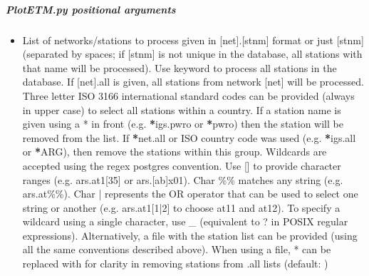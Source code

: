 \documentclass[letterpaper,10pt,english]{sphinxmanual}
\begin{document}
\subparagraph{PlotETM.py positional arguments}
\label{\detokenize{pgamit.com:PlotETM.py-positional-arguments}}\begin{itemize}
\item {} 
\sphinxAtStartPar
{\hyperref[\detokenize{pgamit.com:PlotETM.py-stnlist}]{}} \sphinxhyphen{} List of networks/stations to process given in {[}net{]}.{[}stnm{]} format or just {[}stnm{]} (separated by spaces; if {[}stnm{]} is not unique in the database, all stations with that name will be processed). Use keyword  to process all stations in the database. If {[}net{]}.all is given, all stations from network {[}net{]} will be processed. Three letter ISO 3166 international standard codes can be provided (always in upper case) to select all stations within a country. If a station name is given using a * in front (e.g. {\color{red}\bfseries{}*}igs.pwro or {\color{red}\bfseries{}*}pwro) then the station will be removed from the list. If {\color{red}\bfseries{}*}net.all or ISO country code was used (e.g. {\color{red}\bfseries{}*}igs.all or {\color{red}\bfseries{}*}ARG), then remove the stations within this group. Wildcards are accepted using the regex postgres convention. Use {[}{]} to provide character ranges (e.g. ars.at1{[}3\sphinxhyphen{}5{]} or ars.{[}a\sphinxhyphen{}b{]}x01). Char \%\% matches any string (e.g. ars.at\%\%). Char | represents the OR operator that can be used to select one string or another (e.g. ars.at1{[}1|2{]} to choose at11 and at12). To specify a wildcard using a single character, use \_ (equivalent to ? in POSIX regular expressions). Alternatively, a file with the station list can be provided (using all the same conventions described above). When using a file, * can be replaced with \sphinxhyphen{} for clarity in removing stations from .all lists (default: )

\end{itemize}
\end{document}
